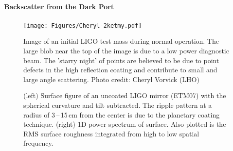 \paragraph{Backscatter from the Dark Port}



\begin{figure}[h]
  \centering
    \texttt{[image: Figures/Cheryl-2ketmy.pdf]}
    \caption{Image of an initial LIGO test mass during normal operation. The large blob near the top of the image is due to a low power diagnostic beam. The 'starry night' of points are believed to be due to point defects in the high reflection coating and contribute to small and large angle scattering. Photo credit: Cheryl Vorvick (LHO)}
    \label{fig:2kETMy}
\end{figure}


\begin{figure}
    \centering
    \qquad
    \caption{(left) Surface figure of an uncoated LIGO mirror (ETM07) with the
      spherical curvature and tilt subtracted. The ripple pattern at a radius
      of 3\,--\,15\,cm from the center is due to the planetary coating technique.
      (right) 1D power spectrum of surface. Also
      plotted is the RMS surface roughness integrated from high to low
      spatial frequency.}
    \label{fig:PhaseMap}
\end{figure}

